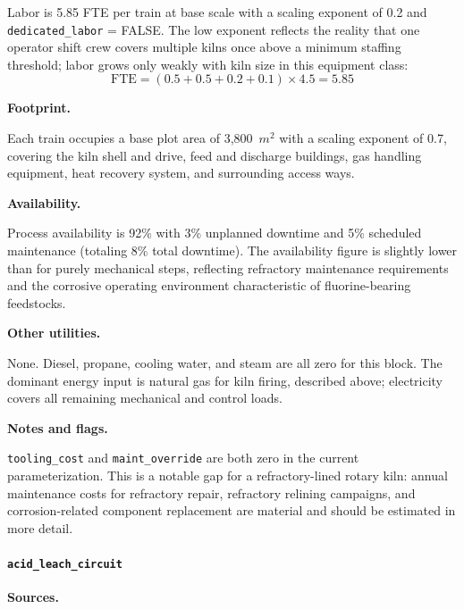 Labor is 5.85 FTE per train at base scale with a scaling exponent of 0.2 and \texttt{dedicated\_labor} = FALSE. The low exponent reflects the reality that one operator shift crew covers multiple kilns once above a minimum staffing threshold; labor grows only weakly with kiln size in this equipment class:
\[
	\text{FTE} = (0.5 + 0.5 + 0.2 + 0.1) \times 4.5 = 5.85
\]

\medskip
\noindent\textbf{Footprint.}\quad

Each train occupies a base plot area of 3,800~$\si{m^2}$ with a scaling exponent of 0.7, covering the kiln shell and drive, feed and discharge buildings, gas handling equipment, heat recovery system, and surrounding access ways.

\medskip
\noindent\textbf{Availability.}\quad

Process availability is 92\% with 3\% unplanned downtime and 5\% scheduled maintenance (totaling 8\% total downtime). The availability figure is slightly lower than for purely mechanical steps, reflecting refractory maintenance requirements and the corrosive operating environment characteristic of fluorine-bearing feedstocks.

\medskip
\noindent\textbf{Other utilities.}\quad

None. Diesel, propane, cooling water, and steam are all zero for this block. The dominant energy input is natural gas for kiln firing, described above; electricity covers all remaining mechanical and control loads.


\medskip
\noindent\textbf{Notes and flags.}\quad

\texttt{tooling\_cost} and \texttt{maint\_override} are both zero in the current parameterization. This is a notable gap for a refractory-lined rotary kiln: annual maintenance costs for refractory repair, refractory relining campaigns, and corrosion-related component replacement are material and should be estimated in more detail.

\clearpage
\paragraph{\texttt{acid\_leach\_circuit}}\label{app:04-methods-blockdefs-acidleach}

\medskip
\noindent\textbf{Sources.}\quad

\citet{iyerLifecycleAnalysisLithium2024, royLithiumClayAssessing2024, khakmardanLifeCycleAssessment2024, mousavinezhadNextLithiumBoom2025, mousavinezhadSustainableLithiumProduction2025, wesselkaemperOptimizationProcessingCosts2025, sgscanadaincSK1300Technical2024, riordanTonopahLithiumClaims2023, fluorenterprisesRhyoliteRidgeLithiumBoron2022}

